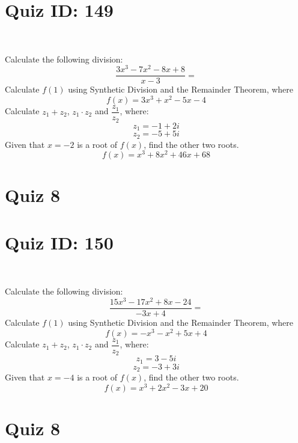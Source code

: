 \documentclass{exam}
\begin{document}
\section*{Quiz ID: 149}
\vspace{0.5cm}\
\vspace{1cm}\
\begin{questions}
\question Calculate the following division:\[\dfrac{
3x^3 - 7x^2 - 8x + 8}{
x - 3}=\] \makeemptybox{\stretch{2}}
\question Calculate $f(1)$ using Synthetic Division and the Remainder Theorem, where\[f(x) = 
3x^3 + x^2 - 5x - 4\]
\newpage\question Calculate $z_1+z_2$, $z_1\cdot z_2$ and $\dfrac{z_1}{z_2}$, where:\[z_1=-1+2\mathit{i}\]\[z_2=-5+5\mathit{i}\]
\question Given that $x=-2$ is a root of $f(x)$, find the other two roots.\[f(x)=
x^3 + 8x^2 + 46x + 68\]\makeemptybox{\stretch{1}}
\end{questions}\newpage
\newpage
\section*{Quiz 8}
\section*{Quiz ID: 150}
\vspace{0.5cm}\
\vspace{1cm}\
\begin{questions}
\question Calculate the following division:\[\dfrac{
15x^3 - 17x^2 + 8x - 24}{
-3x + 4}=\] 
\question Calculate $f(1)$ using Synthetic Division and the Remainder Theorem, where\[f(x) = 
-x^3 - x^2 + 5x + 4\]
\newpage\question Calculate $z_1+z_2$, $z_1\cdot z_2$ and $\dfrac{z_1}{z_2}$, where:\[z_1=3-5\mathit{i}\]\[z_2=-3+3\mathit{i}\]\makeemptybox{\stretch{1}}
\question Given that $x=-4$ is a root of $f(x)$, find the other two roots.\[f(x)=
x^3 + 2x^2 - 3x + 20\]\makeemptybox{\stretch{1}}
\end{questions}\newpage
\newpage
\section*{Quiz 8}
\end{document}
